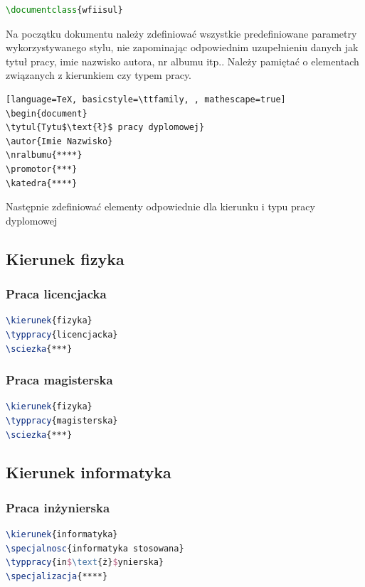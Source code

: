 \documentclass{wfiisul}
\begin{document}
\begin{lstlisting}[language=TeX, basicstyle=\ttfamily]
\documentclass{wfiisul}
\end{lstlisting}

Na początku dokumentu należy zdefiniować wszystkie predefiniowane parametry wykorzystywanego stylu, nie zapominając odpowiednim  uzupełnieniu danych jak tytuł pracy, imie nazwisko autora, nr albumu itp.. Należy pamiętać o elementach związanych z kierunkiem czy typem pracy.

\begin{lstlisting}[language=TeX, basicstyle=\ttfamily, , mathescape=true]
\begin{document}
\tytul{Tytu$\text{ł}$ pracy dyplomowej}
\autor{Imie Nazwisko}
\nralbumu{****}
\promotor{***}
\katedra{****}
\end{lstlisting}

Następnie zdefiniować elementy odpowiednie dla kierunku i typu pracy dyplomowej

\subsection{Kierunek fizyka}

\subsubsection{Praca licencjacka}
\begin{lstlisting}[language=TeX, basicstyle=\ttfamily]
\kierunek{fizyka}
\typpracy{licencjacka}
\sciezka{***}
\end{lstlisting}

\subsubsection{Praca magisterska}
\begin{lstlisting}[language=TeX, basicstyle=\ttfamily]
\kierunek{fizyka}
\typpracy{magisterska}
\sciezka{***}
\end{lstlisting}

\subsection{Kierunek informatyka}
\subsubsection{Praca inżynierska}
\begin{lstlisting}[language=TeX, basicstyle=\ttfamily, mathescape=true]
\kierunek{informatyka}
\specjalnosc{informatyka stosowana}
\typpracy{in$\text{ż}$ynierska}
\specjalizacja{****}
\end{lstlisting}
\end{document}
